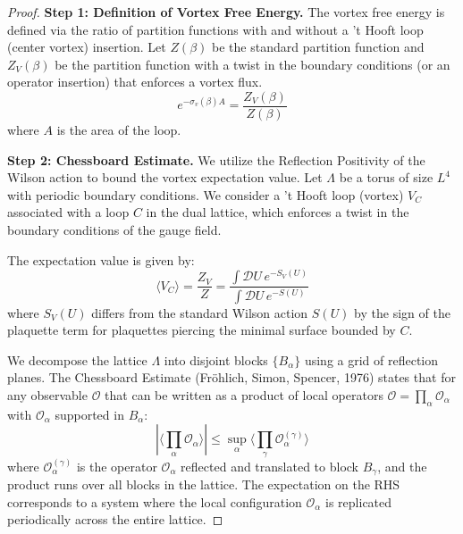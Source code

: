 \begin{proof}
\textbf{Step 1: Definition of Vortex Free Energy.}
The vortex free energy is defined via the ratio of partition functions with and without a 't Hooft loop (center vortex) insertion. Let $Z(\beta)$ be the standard partition function and $Z_V(\beta)$ be the partition function with a twist in the boundary conditions (or an operator insertion) that enforces a vortex flux.
\begin{equation}
e^{-\sigma_v(\beta) A} = \frac{Z_V(\beta)}{Z(\beta)}
\end{equation}
where $A$ is the area of the loop.

\textbf{Step 2: Chessboard Estimate.}
We utilize the Reflection Positivity of the Wilson action to bound the vortex expectation value.
Let $\Lambda$ be a torus of size $L^4$ with periodic boundary conditions. We consider a 't Hooft loop (vortex) $V_C$ associated with a loop $C$ in the dual lattice, which enforces a twist in the boundary conditions of the gauge field.

The expectation value is given by:
\begin{equation}
\langle V_C \rangle = \frac{Z_V}{Z} = \frac{\int \mathcal{D}U \, e^{-S_V(U)}}{\int \mathcal{D}U \, e^{-S(U)}}
\end{equation}
where $S_V(U)$ differs from the standard Wilson action $S(U)$ by the sign of the plaquette term for plaquettes piercing the minimal surface bounded by $C$.

We decompose the lattice $\Lambda$ into disjoint blocks $\{B_\alpha\}$ using a grid of reflection planes.
The Chessboard Estimate (Fröhlich, Simon, Spencer, 1976) states that for any observable $\mathcal{O}$ that can be written as a product of local operators $\mathcal{O} = \prod_\alpha \mathcal{O}_\alpha$ with $\mathcal{O}_\alpha$ supported in $B_\alpha$:
\begin{equation}
|\langle \prod_{\alpha} \mathcal{O}_\alpha \rangle| \leq \sup_{\alpha} \langle \prod_{\gamma} \mathcal{O}_\alpha^{(\gamma)} \rangle
\end{equation}
where $\mathcal{O}_\alpha^{(\gamma)}$ is the operator $\mathcal{O}_\alpha$ reflected and translated to block $B_\gamma$, and the product runs over all blocks in the lattice.
The expectation on the RHS corresponds to a system where the local configuration $\mathcal{O}_\alpha$ is replicated periodically across the entire lattice.


\end{proof}
